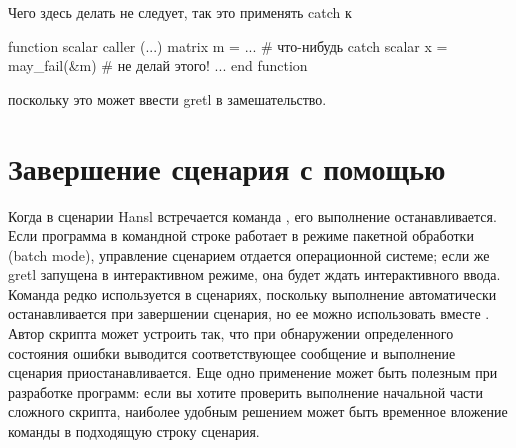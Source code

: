 
Чего здесь делать не следует, так это применять catch к

\begin{code}
function scalar caller (...)
  matrix m = ... # что-нибудь
  catch scalar x = may_fail(&m) # не делай этого!
  ...
end function
\end{code}

поскольку это может ввести gretl в замешательство.

\section{Завершение сценария с помощью }

Когда в сценарии Hansl встречается команда , его выполнение
останавливается. Если программа  в командной строке
работает в режиме пакетной обработки (batch mode), управление
сценарием отдается операционной системе; если же gretl запущена в
интерактивном режиме, она будет ждать интерактивного ввода.  Команда
 редко используется в сценариях, поскольку выполнение
автоматически останавливается при завершении сценария, но ее можно
использовать вместе . Автор скрипта может устроить так, что
при обнаружении определенного состояния ошибки выводится
соответствующее сообщение и выполнение сценария
приостанавливается. Еще одно применение  может быть полезным
при разработке программ: если вы хотите проверить выполнение начальной
части сложного скрипта, наиболее удобным решением может быть временное
вложение команды  в подходящую строку сценария.

